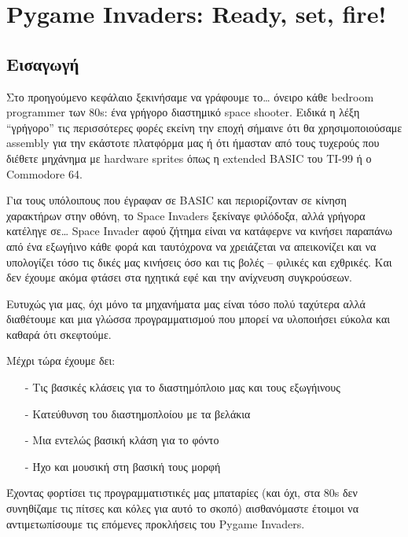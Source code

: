 \chapter{Pygame Invaders: Ready, set, fire!}
\label{chap:pygame-invaders-fire}
\section{Εισαγωγή}
Στο προηγούμενο κεφάλαιο ξεκινήσαμε να γράφουμε το\ldots{} όνειρο κάθε bedroom programmer των 80s: ένα γρήγορο διαστημικό space shooter.  Ειδικά η λέξη ``γρήγορο'' τις περισσότερες φορές εκείνη την εποχή σήμαινε ότι θα χρησιμοποιούσαμε assembly για την εκάστοτε πλατφόρμα μας ή ότι ήμασταν από τους τυχερούς που διέθετε μηχάνημα με hardware sprites όπως η extended BASIC του ΤΙ-99 ή ο Commodore 64.

Για τους υπόλοιπους που έγραφαν σε BASIC και περιορίζονταν σε κίνηση χαρακτήρων στην οθόνη, το Space Invaders ξεκίναγε φιλόδοξα, αλλά γρήγορα κατέληγε σε\ldots{} Space Invader αφού ζήτημα είναι να κατάφερνε να κινήσει παραπάνω από ένα εξωγήινο κάθε φορά και ταυτόχρονα να χρειάζεται να απεικονίζει και να υπολογίζει τόσο τις δικές μας κινήσεις όσο και τις βολές -- φιλικές και εχθρικές. Και δεν έχουμε ακόμα φτάσει στα ηχητικά εφέ και την ανίχνευση συγκρούσεων.

Ευτυχώς για μας, όχι μόνο τα μηχανήματα μας είναι τόσο πολύ ταχύτερα αλλά διαθέτουμε και μια γλώσσα προγραμματισμού που μπορεί να υλοποιήσει εύκολα και καθαρά ότι σκεφτούμε.

Μέχρι τώρα έχουμε δει:
\begin{itemize}
\item[-] Τις βασικές κλάσεις για το διαστημόπλοιο μας και τους εξωγήινους
\item[-] Κατεύθυνση του διαστημοπλοίου με τα βελάκια
\item[-] Μια εντελώς βασική κλάση για το φόντο
\item[-] Ήχο και μουσική στη βασική τους μορφή
\end{itemize}
%
Έχοντας φορτίσει τις προγραμματιστικές μας μπαταρίες (και όχι, στα 80s δεν συνηθίζαμε τις πίτσες και κόλες για αυτό το σκοπό) αισθανόμαστε έτοιμοι να αντιμετωπίσουμε τις επόμενες προκλήσεις του Pygame Invaders.

